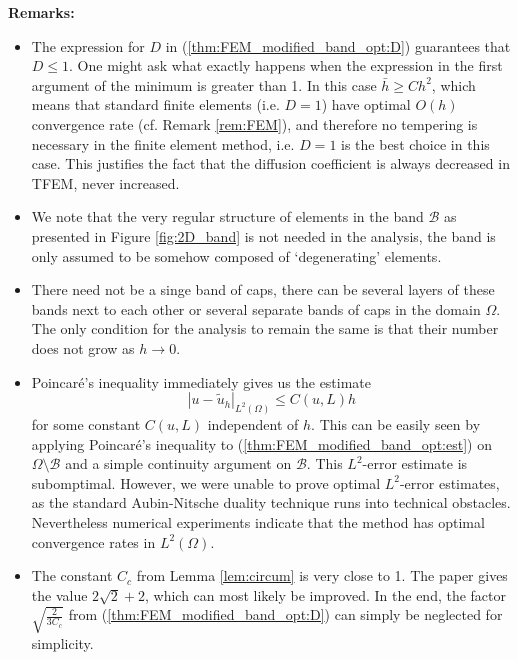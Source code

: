 \documentclass{article}
\theoremstyle{remark}
\def\B{\mathcal{B}}
\def\tu{\tilde{u}}
\def\width{\bar{h}}
\begin{document}
\noindent\textbf{Remarks:}
\begin{itemize}
    \item The expression for $D$ in (\ref{thm:FEM_modified_band_opt:D}) guarantees that  $D\leq 1$. One might ask what exactly happens when the expression in the first argument of the minimum is greater than 1. In this case $\width\ge Ch^2$, which means that standard finite elements (i.e. $D=1$) have optimal $O(h)$ convergence rate (cf. Remark \ref{rem:FEM}), and therefore no tempering is necessary in the finite element method, i.e. $D=1$ is the best choice in this case. This justifies the fact that the diffusion coefficient is always decreased in TFEM, never increased.
    \item We note that the very regular structure of elements in the band $\B$ as presented in Figure \ref{fig:2D_band} is not needed in the analysis, the band is only assumed to be somehow composed of `degenerating' elements.
    \item There need not be a singe band of caps, there can be several layers of these bands next to each other or several separate bands of caps in the domain $\Omega$. The only condition for the analysis to remain the same is that their number does not grow as $h\to 0$.
    \item Poincar\'{e}'s inequality immediately gives us the estimate
    \begin{equation}
    \label{est:Poincare}
    |u-\tu_h|_{L^2(\Omega)}\leq C(u,L)h
    \end{equation}
    for some constant $C(u,L)$ independent of $h$. This can be easily seen by applying Poincar\'{e}'s inequality to (\ref{thm:FEM_modified_band_opt:est}) on $\Omega\setminus\B$ and a simple continuity argument on $\B$. This $L^2$-error estimate is subomptimal. However, we were unable to prove optimal $L^2$-error estimates, as the standard Aubin-Nitsche duality technique runs into technical obstacles. Nevertheless numerical experiments indicate that the method has optimal convergence rates in $L^2(\Omega)$. 
    \item The constant $C_c$ from Lemma \ref{lem:circum} is very close to 1. The paper \cite{Kucera_circumradius} gives the value $2\sqrt{2}+2$, which can most likely be improved. In the end, the factor $\sqrt{\frac{2}{3C_c}}$ from (\ref{thm:FEM_modified_band_opt:D}) can simply be neglected for simplicity.
\end{itemize}
\end{document}
